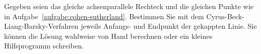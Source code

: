 %
Gegeben seien das gleiche achsenparallele Rechteck und die gleichen
Punkte wie in Aufgabe~\ref{aufgabe:cohen-sutherland}. Bestimmen Sie mit 
dem Cyrus-Beck-Liang-Barsky-Verfahren jeweils Anfangs- und Endpunkt der 
gekappten Linie. Sie können die Lösung wahlweise von Hand berechnen oder
ein kleines Hilfsprogramm schreiben.
